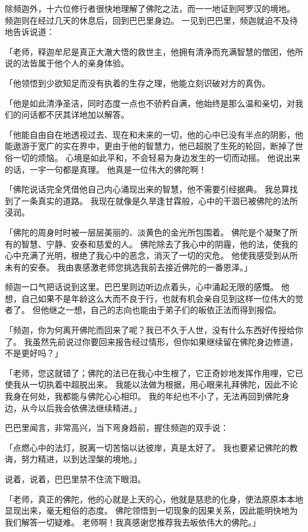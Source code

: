 \documentclass[twoside,openany]{book}
\begin{document}
除频迦外，十六位修行者很快地理解了佛陀之法，而一一地证到阿罗汉的境地。
频迦则在经过几天的休息后，回到巴巴里身边。
一见到巴巴里，频迦就迫不及待地告诉说道：

「老师，释迦牟尼是真正大澈大悟的救世主，他拥有清浄而充满智慧的僧团，他所说的法皆属于他个人的亲身体验。

「他领悟到少欲知足而没有执着的生存之理，他能立刻识破对方的真伪。

「他是如此清浄圣洁，同时态度一点也不骄矜自满，他始终是那么温和亲切，对我们的问话都不厌其详地加以解答。

「他能自由自在地透视过去、现在和未来的一切，他的心中已没有半点的阴影，他能遨游于宽广的实在界中，更由于他的智慧力，他已超脱了生死的轮回，断掉了世俗一切的烦恼。
心境是如此平和，不会轻易为身边发生的一切而动摇。
他说出来的话，一宇一句都是真理。
他真是一位伟大的佛陀啊！

「佛陀说话完全凭借他自己内心涌现出来的智慧，他不需要引经据典。
我总算找到了一条真实的道路。
我现在就像是久旱逢甘霖般，心中的干涸已被佛陀的法所浸润。

「佛陀的周身时时被一层层美丽的、淡黄色的金光所包围着。
佛陀是个凝聚了所有的智慧、宁静、安泰和慈爱的人。
佛陀除去了我心中的阴霾，他的法，使我的心中充满了光明，根绝了我心中的恶念，消灭了一切的灾危。
他使我感受到从所未有的安泰。
我由衷感激老师您挑选我前去接近佛陀的一番恩泽。」

频迦一口气把话说到这里。巴巴里则边听边点着头，心中涌起无限的感慨。
他想，自己如果不是年龄这么大而不良于行，也就有机会亲自见到这样一位伟大的觉者了。
但他继之一想，自己的志向也能由于弟子们的皈依正法而得到报偿。

「频迦，你为何离开佛陀而回来了呢？我已不久于人世，没有什么东西好传授给你了。
我虽然先前说过你要回来报告经过情形，但你如果继续留在佛陀身边修道，不是更好吗？」

「老师，您这就错了；佛陀的法已在我心中生根了，它正奇妙地发挥作用哩，它已使我从一切执着中超脱出来。
我能以法做为根据，用心眼来礼拜佛陀，因此不论我身在何处，我都能与佛陀心心相印。
我的年纪也不小了，无法再回到佛陀身边，从今以后我会依佛法继续精进。」

巴巴里闻言，非常高兴，当下弯身趋前，握住频迦的双手说：

「点燃心中的法灯，脱离一切苦恼以达彼岸，真是太好了。
我也要紧记佛陀的教诲，努力精进，以到达涅槃的境地。」

说着，说着，巴巴里禁不住流下眼泪。

「老师，真正的佛陀，他的心就是上天的心，他就是慈悲的化身，使法原原本本地显现出来，毫无粗俗的态度。
佛陀领悟到一切现象的因果关系，因此能明快地为我们解答一切疑难。
老师啊！我真感谢您推荐我去皈依伟大的佛陀。」
\end{document}
